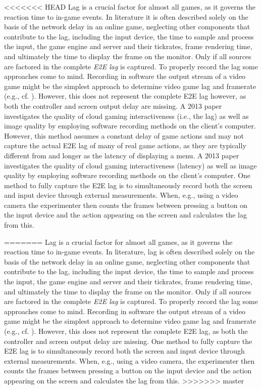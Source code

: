 <<<<<<< HEAD
Lag is a crucial factor for almost all games, as it governs the reaction time to in-game events. In literature it is often described solely on the basis of the network delay in an online game, neglecting other components that contribute to the lag, including the input device, the time to sample and process the input, the game engine and server and their tickrates, frame rendering time, and ultimately the time to display the frame on the monitor. Only if all sources are factored in the complete \textit{\gls{E2E} lag} is captured. To properly record the lag some approaches come to mind. Recording in software the output stream of a video game might be the simplest approach to determine video game lag and framerate (e.g., cf. \cite{Chen:2011:MLC:2072298.2071991}). However, this does not represent the complete \gls{E2E} lag however, as both the controller and screen output delay are missing. A 2013 paper \cite{6574660} investigates the quality of cloud gaming interactiveness (i.e., the lag) as well as image quality by employing software recording methods on the client's computer. However, this method assumes a constant delay of game actions and may not capture the actual \gls{E2E} lag of many of real game actions, as they are typically different from and longer as the latency of displaying a menu. A 2013 paper \cite{6574660} investigates the quality of cloud gaming interactiveness (latency) as well as image quality by employing software recording methods on the client's computer. One method to fully capture the \gls{E2E} lag is to simultaneously record both the screen and input device through external measurements. When, e.g., using a video camera the experimenter then counts the frames between pressing a button on the input device and the action appearing on the screen and calculates the lag from this.

=======
Lag is a crucial factor for almost all games, as it governs the reaction time to in-game events. In literature, lag is often described solely on the basis of the network delay in an online game, neglecting other components that contribute to the lag, including the input device, the time to sample and process the input, the game engine and server and their tickrates, frame rendering time, and ultimately the time to display the frame on the monitor. Only if all sources are factored in the complete \textit{\gls{E2E} lag} is captured. To properly record the lag some approaches come to mind. Recording in software the output stream of a video game might be the simplest approach to determine video game lag and framerate (e.g., cf. \cite{Chen:2011:MLC:2072298.2071991}). However, this does not represent the complete \gls{E2E} lag, as both the controller and screen output delay are missing. One method to fully capture the \gls{E2E} lag is to simultaneously record both the screen and input device through external measurements. When, e.g., using a video camera, the experimenter then counts the frames between pressing a button on the input device and the action appearing on the screen and calculates the lag from this.
>>>>>>> master

